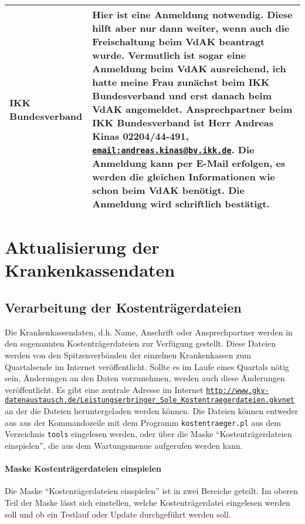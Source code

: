 \begin{mpsupertabular}{|p{4cm}|p{9.8cm}|}
IKK Bundesverband&
Hier ist eine Anmeldung notwendig. Diese hilft aber nur
dann weiter, wenn auch die Freischaltung beim VdAK beantragt wurde.
Vermutlich ist sogar eine Anmeldung beim VdAK ausreichend, ich hatte meine
Frau zunächst beim IKK Bundesverband und erst danach beim VdAK
angemeldet. Ansprechpartner beim IKK Bundesverband ist Herr Andreas Kinas
02204/44-491, {\href{email:andreas.kinas@bv.ikk.de}{\nolinkurl{email:andreas.kinas@bv.ikk.de}}}. Die Anmeldung kann per
E-Mail erfolgen, es werden die gleichen Informationen wie schon beim
VdAK benötigt. Die Anmeldung wird schriftlich bestätigt.
\\ \hline

\end{mpsupertabular}



\section{Aktualisierung der Krankenkassendaten\label{anhang:aktkk}}
\subsection{Verarbeitung der Kostenträgerdateien\label{anhang:ktrdat}}
Die Krankenkassendaten, d.h. Name, Anschrift oder Ansprechpartner werden
in den sogenannten Kostenträgerdateien \cite{ktrdat} zur Verfügung gestellt.
Diese Dateien werden von den Spitzenverbänden der einzelnen 
Krankenkassen zum Quartalsende im Internet veröffentlicht.
Sollte es im Laufe eines Quartals nötig sein, Änderungen an den Daten
vorzunehmen, werden auch diese Änderungen veröffentlicht.
Es gibt eine zentrale Adresse im Internet {\href{http://www.gkv-datenaustausch.de/Leistungserbringer_Sole_Kostentraegerdateien.gkvnet}
{\nolinkurl{http://www.gkv-datenaustausch.de/Leistungserbringer_Sole_Kostentraegerdateien.gkvnet}}}
an der die
Dateien heruntergeladen werden können. 
Die Dateien können entweder aus aus der Kommandozeile mit dem Programm
\verb|kostentraeger.pl| aus dem Verzeichnis \verb|tools| eingelesen werden,
oder über die Maske ``Kostenträgerdateien einspielen'', die aus dem 
Wartungsmenue aufgerufen werden kann.

\paragraph{Maske Kostenträgerdateien einspielen}

Die Maske ``Kostenrägerdateien einspielen'' ist in zwei Bereiche geteilt.
Im oberen Teil der Maske lässt sich einstellen, welche Kostenträgerdatei
eingelesen werden soll und ob ein Testlauf oder Update durchgeführt werden
soll.

